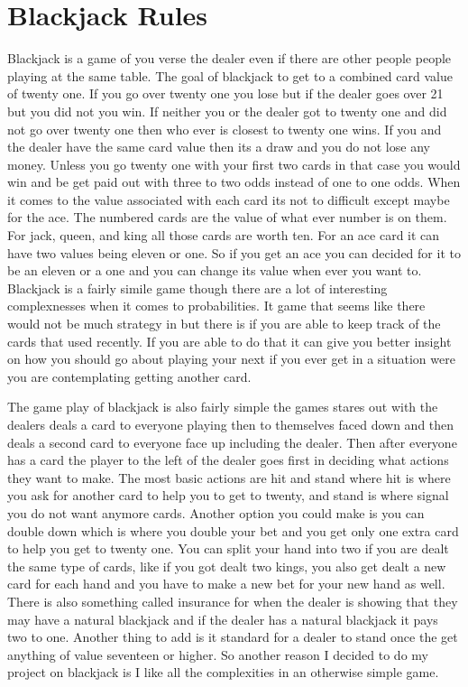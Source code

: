 \documentclass[twoside]{article}
\begin{document}
\section{Blackjack Rules}
Blackjack is a game of you verse the dealer even if there are other people people playing at the same table. The goal of blackjack to get to a combined card value of twenty one. If you go over twenty one you lose but if the dealer goes over 21 but you did not you win. If neither you or the dealer got to twenty one and did not go over twenty one then who ever is closest to twenty one wins. If you and the dealer have the same card value then its a draw and you do not lose any money. Unless you go twenty one with your first two cards in that case you would win and be get paid out with three to two odds instead of one to one odds. When it comes to the value associated with each card its not to difficult except maybe for the ace. The numbered cards are the value of what ever number is on them. For jack, queen, and king all those cards are worth ten. For an ace card it can have two values being eleven or one. So if you get an ace you can decided for it to be an eleven or a one and you can change its value when ever you want to. Blackjack is a fairly simile game though there are a lot of interesting complexnesses when it comes to probabilities. It game that seems like there would not be much strategy in but there is if you are able to keep track of the cards that used recently. If you are able to do that it can give you better insight on how you should go about playing your next if you ever get in a situation were you are contemplating getting another card.

The game play of blackjack is also fairly simple the games stares out with the dealers deals a card to everyone playing then to themselves faced down and then deals a second card to everyone face up including the dealer. Then after everyone has a card the player to the left of the dealer goes first in deciding what actions they want to make. The most basic actions are hit and stand where hit is where you ask for another card to help you to get to twenty, and stand is where signal you do not want anymore cards. Another option you could make is you can double down which is where you double your bet and you get only one extra card to help you get to twenty one. You can split your hand into two if you are dealt the same type of cards, like if you got dealt two kings, you also get dealt a new card for each hand and you have to make a new bet for your new hand as well. There is also something called insurance for when the dealer is showing that they may have a natural blackjack and if the dealer has a natural blackjack it pays two to one. Another thing to add is it standard for a dealer to stand once the get anything of value seventeen or higher. So another reason I decided to do my project on blackjack is I like all the complexities in an otherwise simple game.
\end{document}
